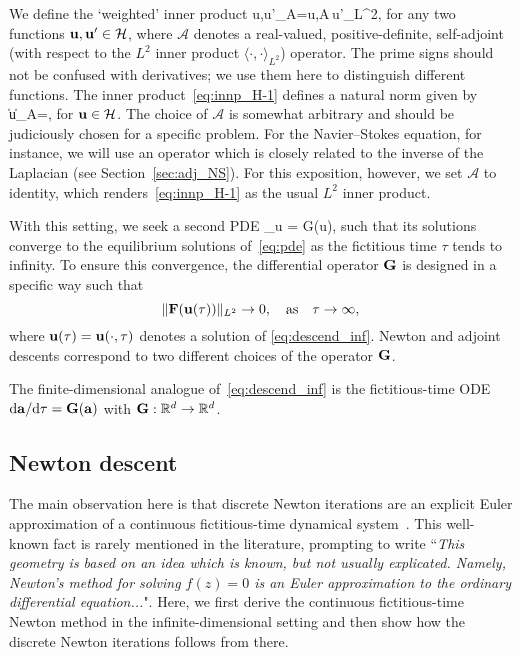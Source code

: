 \documentclass{jfm}
\begin{document}
We define the `weighted' inner product
\beq
\langle \vc u,\vc u'\rangle_{\mathcal A}=\langle \vc u,\mathcal A\,\vc u'\rangle_{L^2},
\label{eq:innp_H-1}
\eeq
for any two functions $\mathbf u,\mathbf u'\in\mathcal H$,
where $\mathcal A$ denotes a real-valued, positive-definite, self-adjoint (with respect to the $L^2$
inner product $\langle\cdot,\cdot\rangle_{L^2}$) operator.
The prime signs should not be confused with derivatives; we use them here
to distinguish different functions.
The inner product~\eqref{eq:innp_H-1} defines a natural norm given by
\beq
\|\vc u\|_{\mathcal A}=,
\label{eq:normA}
\eeq
for $\mathbf u\in\mathcal H$.
The choice of $\mathcal A$ is somewhat arbitrary and 
should be judiciously chosen for a specific
problem. For the Navier--Stokes equation, for instance, we will use an operator
which is closely related to the inverse of the Laplacian (see Section~\ref{sec:adj_NS}).
For this exposition, however, we set $\mathcal A$ to identity, which renders~\eqref{eq:innp_H-1}
as the usual $L^2$ inner product.

With this setting, we seek a second PDE
\beq
\partial_\tau\vc u = \vc G(\vc u),
\label{eq:descend_inf}
\eeq
such that its solutions
converge to the equilibrium solutions of~\eqref{eq:pde} as the fictitious
time $\tau$ tends to infinity.  To ensure this convergence, the differential operator $\mathbf G$ is
designed in a specific way such that
$$\|\mathbf F(\mathbf u(\tau))\|_{L^2}\to 0,\quad \mbox{as}\quad\tau\to\infty,$$
where $\mathbf u(\tau)= \mathbf u(\cdot, \tau)$ denotes a solution of \eqref{eq:descend_inf}.
Newton and adjoint descents correspond to two different choices of the operator
$\mathbf G$.

The finite-dimensional analogue of~\eqref{eq:descend_inf} is the fictitious-time ODE
$\mbox d\mathbf a/\mbox d\tau=\mathbf G(\mathbf a)$
with $\mathbf G:\mathbb R^d\to\mathbb R^d$.

\subsection{Newton descent}\label{sec:descend_inf}
The main observation here is that discrete Newton iterations are
an explicit Euler approximation of a continuous fictitious-time dynamical
system~\citep{saupe88}.
This well-known fact is
rarely mentioned in the literature, prompting
\cite{smale81} to write ``\textit{This geometry is based on an idea which is known,
but not usually explicated. Namely, Newton's method for
solving $f(z)=0$ is an Euler approximation to the ordinary differential equation...}".
Here, we first derive the continuous fictitious-time Newton method in the infinite-dimensional setting
and then show how the discrete Newton iterations follows from there.
\end{document}
